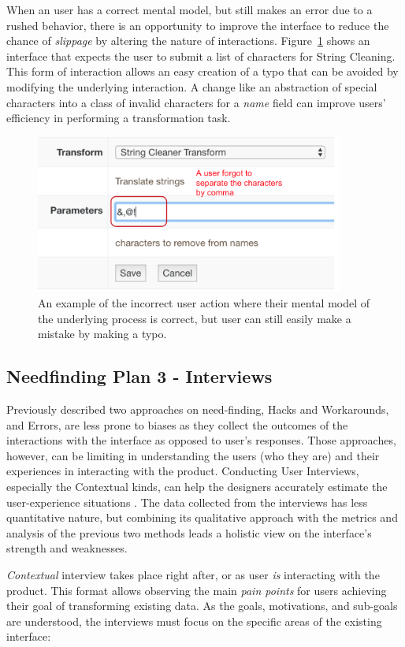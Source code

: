 \documentclass[12pt,letterpaper]{article}
\begin{document}
When an user has a correct mental model, but still makes an error due to a rushed behavior, there is an opportunity to improve the interface to reduce the chance of \textit{slippage} by altering the nature of interactions. Figure~\ref{fig::6} shows an interface that expects the user to submit a list of characters for String Cleaning. This form of interaction allows an easy creation of a typo that can be avoided by modifying the underlying interaction. A change like an abstraction of special characters into a class of invalid characters for a \textit{name} field can improve users' efficiency in performing a transformation task.

\begin{figure}[h]
\centering
\includegraphics[width=4in, scale=.3]{slip.png}
\caption{An example of the incorrect user action where their mental model of the underlying process is correct, but user can still easily make a mistake by making a typo.}
\label{fig::6}
\end{figure}

\subsection*{Needfinding Plan 3 - Interviews}
Previously described two approaches on need-finding, Hacks and Workarounds, and Errors, are less prone to biases as they collect the outcomes of the interactions with the interface as opposed to user's responses. Those approaches, however, can be limiting in understanding the users (who they are) and their experiences in interacting with the product. Conducting User Interviews, especially the Contextual kinds, can help the designers accurately estimate the user-experience situations \cite{basics_ux_design}. The data collected from the interviews has less quantitative nature, but combining its qualitative approach with the metrics and analysis of the previous two methods leads a holistic view on the interface's strength and weaknesses.   

\textit{Contextual} interview takes place right after, or as user \textit{is} interacting with the product. This format allows observing the main \textit{pain points} for users achieving their goal of transforming existing data. As the goals, motivations, and sub-goals are understood, the interviews must focus on the specific areas of the existing interface:
\end{document}
